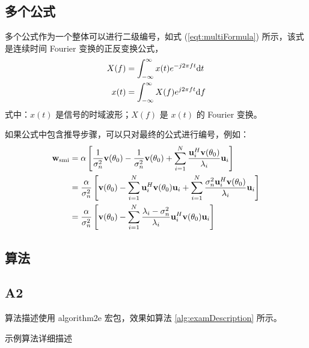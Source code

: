 \subsection{多个公式}%

多个公式作为一个整体可以进行二级编号，如式 (\ref{eqt:multiFormula}) 所示，该式是连续时间 Fourier 变换的正反变换公式，
\begin{subequations}\label{eqt:multiFormula}
	\begin{align}
		X(f) & = \int_{-\infty}^{\infty}x(t)e^{-j2\pi f t}\mathrm{d} t \\
		x(t) & = \int_{-\infty}^{\infty}X(f)e^{j2\pi f t}\mathrm{d} f
	\end{align}
\end{subequations}
式中：$x(t)$ 是信号的时域波形；$X(f)$ 是 $x(t)$ 的 Fourier 变换。

如果公式中包含推导步骤，可以只对最终的公式进行编号，例如：
\begin{align}
	\mathbf{w}_{\mathrm{smi}} & = \alpha \left[\frac{1}{\sigma_n^2}\mathbf{v}(\theta_0) - \frac{1}{\sigma_n^2}\mathbf{v}(\theta_0) + \sum_{i=1}^{N} \frac{\mathbf{u}_i^H\mathbf{v}(\theta_0)}{\lambda_i} \mathbf{u}_i\right] \nonumber                         \\
	                       & = \frac{\alpha}{\sigma_n^2} \left[\mathbf{v}(\theta_0) - \sum_{i=1}^{N}\mathbf{u}_i^H\mathbf{v}(\theta_0)\mathbf{u}_i +  \sum_{i=1}^{N}\frac{\sigma_n^2\mathbf{u}_i^H\mathbf{v}(\theta_0)}{\lambda_i} \mathbf{u}_i \right] \nonumber \\
	                       & = \frac{\alpha}{\sigma_n^2} \left[\mathbf{v}(\theta_0) - \sum_{i=1}^{N} \frac{\lambda_i-\sigma_n^2}{\lambda_i} \mathbf{u}_i^H\mathbf{v}(\theta_0)\mathbf{u}_i \right]
\end{align}

\subsection{算法}

\subsection{A2}
算法描述使用 algorithm2e 宏包，效果如算法 \ref{alg:examDescription} 所示。

\begin{algorithm}[htbp]
    \caption{示例算法详细描述}
    \label{alg:examDescription}

\end{algorithm}

